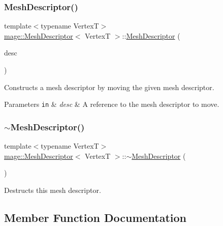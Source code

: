 \subsubsection{\texorpdfstring{Mesh\+Descriptor()}{MeshDescriptor()}\hspace{0.1cm}{\footnotesize\ttfamily [3/3]}}
{\footnotesize\ttfamily template$<$typename VertexT$>$ \\
\hyperlink{structmage_1_1_mesh_descriptor}{mage\+::\+Mesh\+Descriptor}$<$ VertexT $>$\+::\hyperlink{structmage_1_1_mesh_descriptor}{Mesh\+Descriptor} (\begin{DoxyParamCaption}\item[{\hyperlink{structmage_1_1_mesh_descriptor}{Mesh\+Descriptor}$<$ VertexT $>$ \&\&}]{desc }\end{DoxyParamCaption})\hspace{0.3cm}{\ttfamily [default]}}

Constructs a mesh descriptor by moving the given mesh descriptor.


\begin{DoxyParams}[1]{Parameters}
\mbox{\tt in}  & {\em desc} & A reference to the mesh descriptor to move. \\
\hline
\end{DoxyParams}
\hypertarget{structmage_1_1_mesh_descriptor_adca32db164ab3032164c8dfe17af3db4}{}\label{structmage_1_1_mesh_descriptor_adca32db164ab3032164c8dfe17af3db4} 
\subsubsection{\texorpdfstring{$\sim$\+Mesh\+Descriptor()}{~MeshDescriptor()}}
{\footnotesize\ttfamily template$<$typename VertexT$>$ \\
\hyperlink{structmage_1_1_mesh_descriptor}{mage\+::\+Mesh\+Descriptor}$<$ VertexT $>$\+::$\sim$\hyperlink{structmage_1_1_mesh_descriptor}{Mesh\+Descriptor} (\begin{DoxyParamCaption}{ }\end{DoxyParamCaption})\hspace{0.3cm}{\ttfamily [default]}}

Destructs this mesh descriptor. 

\subsection{Member Function Documentation}
\hypertarget{structmage_1_1_mesh_descriptor_ab81b000d93242ae002227010c4a9446c}{}\label{structmage_1_1_mesh_descriptor_ab81b000d93242ae002227010c4a9446c} 
